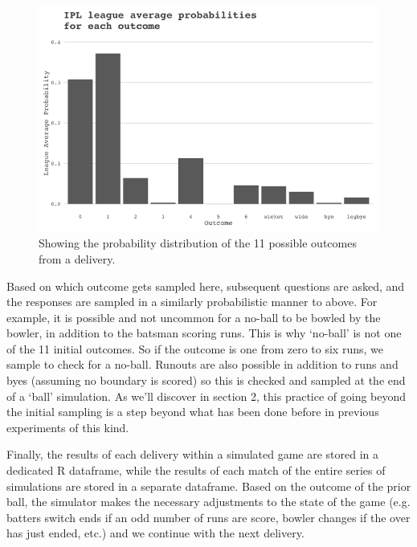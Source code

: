 \begin{figure}
    \centering
    \includegraphics{images/Picture 1.png}
    \caption{Showing the probability distribution of the 11 possible outcomes from a delivery.}
    \label{fig:my_label}
\end{figure}

Based on which outcome gets sampled here, subsequent questions are asked, and the responses are sampled in a similarly probabilistic manner to above. For example, it is possible and not uncommon for a no-ball to be bowled by the bowler, in addition to the batsman scoring runs. This is why ‘no-ball’ is not one of the 11 initial outcomes. So if the outcome is one from zero to six runs, we sample to check for a no-ball. Runouts are also possible in addition to runs and byes (assuming no boundary is scored) so this is checked and sampled at the end of a ‘ball’ simulation. As we’ll discover in section 2, this practice of going beyond the initial sampling is a step beyond what has been done before in previous experiments of this kind.

Finally, the results of each delivery within a simulated game are stored in a dedicated R dataframe, while the results of each match of the entire series of simulations are stored in a separate dataframe. Based on the outcome of the prior ball, the simulator makes the necessary adjustments to the state of the game (e.g. batters switch ends if an odd number of runs are score, bowler changes if the over has just ended, etc.) and we continue with the next delivery.
